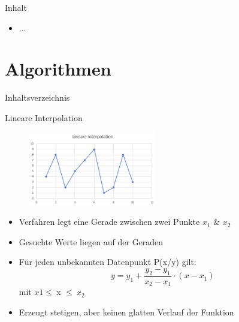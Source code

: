 
\begin{frame}{Inhalt}
	\begin{block}{}
		\begin{itemize}
			\item ...
		\end{itemize}
	\end{block}
\end{frame}

\section{Algorithmen}
\begin{frame}{Inhaltsverzeichnis}
\tableofcontents[currentsection]
\end{frame}

\begin{frame}{Lineare Interpolation}
\begin{figure}
  \centering
     \includegraphics[width=0.5\textwidth]{pics/linear.png}
  \label{fig:Bild1}
\end{figure}
\begin{itemize}
\item Verfahren legt eine Gerade zwischen zwei Punkte $x_1$ \& $x_2$
\item Gesuchte Werte liegen auf der Geraden
\item Für jeden unbekannten Datenpunkt P(x/y) gilt:
$$y = y_1 + \frac{y_2 - y_1}{x_2 - x_1} \cdot (x - x_1)$$
mit $x1\leq\ $x $\leq \ x_2$
\item Erzeugt stetigen, aber keinen glatten Verlauf der Funktion
\end{itemize}
\end{frame}


